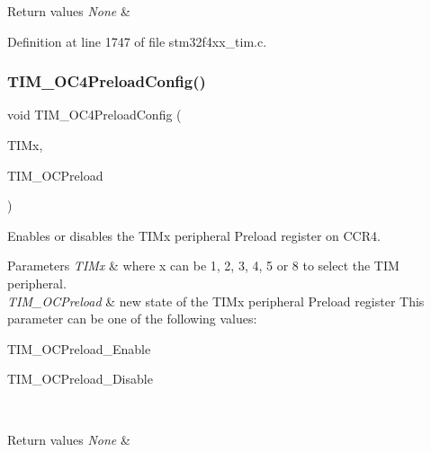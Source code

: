 \begin{DoxyRetVals}{Return values}
{\em None} & \\
\hline
\end{DoxyRetVals}


Definition at line 1747 of file stm32f4xx\+\_\+tim.\+c.

\mbox{\label{group___t_i_m___group2_ga8bf4dfb35ff0c7b494dd96579f50b1ec}} 
\subsubsection{\texorpdfstring{T\+I\+M\+\_\+\+O\+C4\+Preload\+Config()}{TIM\_OC4PreloadConfig()}}
{\footnotesize\ttfamily void T\+I\+M\+\_\+\+O\+C4\+Preload\+Config (\begin{DoxyParamCaption}\item[{\hyperlink{struct_t_i_m___type_def}{T\+I\+M\+\_\+\+Type\+Def} $\ast$}]{T\+I\+Mx,  }\item[{uint16\+\_\+t}]{T\+I\+M\+\_\+\+O\+C\+Preload }\end{DoxyParamCaption})}



Enables or disables the T\+I\+Mx peripheral Preload register on C\+C\+R4. 


\begin{DoxyParams}{Parameters}
{\em T\+I\+Mx} & where x can be 1, 2, 3, 4, 5 or 8 to select the T\+IM peripheral. \\
\hline
{\em T\+I\+M\+\_\+\+O\+C\+Preload} & new state of the T\+I\+Mx peripheral Preload register This parameter can be one of the following values\+: \begin{DoxyItemize}
\item T\+I\+M\+\_\+\+O\+C\+Preload\+\_\+\+Enable \item T\+I\+M\+\_\+\+O\+C\+Preload\+\_\+\+Disable \end{DoxyItemize}
\\
\hline
\end{DoxyParams}

\begin{DoxyRetVals}{Return values}
{\em None} & \\
\hline
\end{DoxyRetVals}


